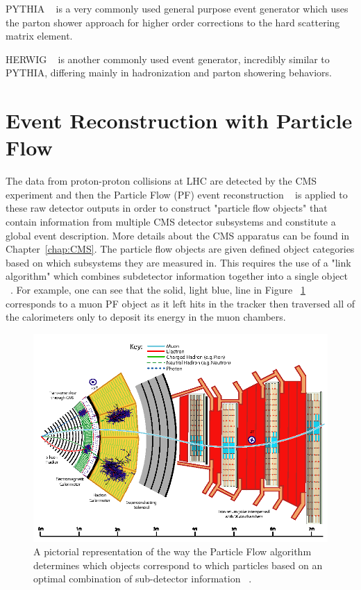 PYTHIA ~\cite{Sjostrand:2006za} is a very commonly used general purpose event generator which uses the parton shower approach for higher order corrections to the hard scattering matrix element.

HERWIG  ~\cite{herwigpp} is another commonly used event generator, incredibly similar to PYTHIA, differing mainly in hadronization and parton showering behaviors.


\section{Event Reconstruction with Particle Flow}\label{sec:PFReco}


The data from proton-proton collisions at LHC are detected by the CMS experiment and then the Particle Flow (PF) event reconstruction ~\cite{Sirunyan:2017ulk} is applied to these raw detector outputs in order to construct "particle flow objects" that contain information from multiple CMS detector subsystems and constitute a global event description. More details about the CMS apparatus can be found in Chapter~\ref{chap:CMS}. The particle flow objects are given defined object categories based on which subsystems they are measured in. This requires the use of a "link algorithm" which combines subdetector information together into a single object ~\cite{Sirunyan:2017ulk}. For example, one can see that the solid, light blue, line in Figure ~\ref{fig:cmsPF} corresponds to a muon PF object as it left hits in the tracker then traversed all of the calorimeters only to deposit its energy in the muon chambers.


\begin{figure}[htb]
\centering
\includegraphics[width=1.0\textwidth]{Chapter-1/cmsPflow.png}
\caption{A pictorial representation of the way the Particle Flow algorithm determines which objects correspond to which particles based on an optimal combination of sub-detector information ~\cite{Sirunyan:2017ulk}.}
\label{fig:cmsPF}
\end{figure}


